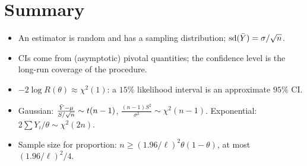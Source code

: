 \section*{Summary}
\begin{itemize}
  \item An estimator is random and has a sampling distribution; $\operatorname{sd}(\bar{Y}) = \sigma/\sqrt n$.
  \item CIs come from (asymptotic) pivotal quantities; the confidence level is the long-run
        coverage of the procedure.
  \item $-2\log R(\theta)\approx\chi^2(1)$: a $15\%$ likelihood interval is an approximate
        $95\%$ CI.
  \item Gaussian: $\frac{\bar{Y}-\mu}{S/\sqrt n}\sim t(n-1)$, $\frac{(n-1)S^2}{\sigma^2}\sim
        \chi^2(n-1)$. Exponential: $2\sum Y_i/\theta\sim\chi^2(2n)$.
  \item Sample size for proportion: $n\ge(1.96/\ell)^2\theta(1-\theta)$, at most
        $(1.96/\ell)^2/4$.
\end{itemize}
